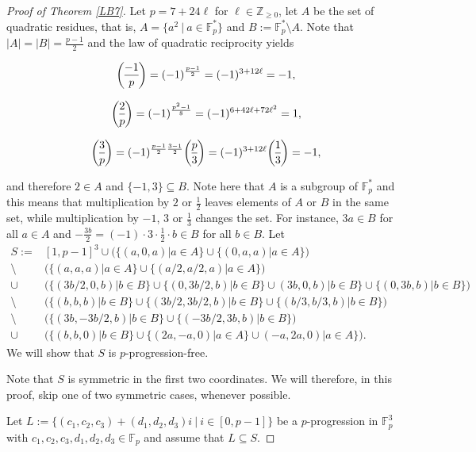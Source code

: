 \documentclass[12pt]{amsart}
\newcommand{\<}{\langle}
\renewcommand{\>}{\rangle}
\numberwithin{equation}{section}
\numberwithin{theorem}{section}
\newcommand{\genlegendre}[4]{%
  \genfrac{(}{)}{}{#1}{#3}{#4}%
  \if\relax\detokenize{#2}\relax\else_{\!#2}\fi
}
\newcommand{\legendre}[3][]{\genlegendre{}{#1}{#2}{#3}}
\begin{document}
\begin{proof}[Proof of Theorem \ref{LB7}]
Let $p=7+24\ell$ for $\ell\in\mathbb{Z}_{\geq0}$, let $A$ be the set of quadratic residues, that is, $A=\{a^2\ |\ a\in\mathbb{F}_p^*\}$ and $B:=\mathbb{F}_p^*\setminus A$. Note that $|A|=|B|=\frac{p-1}{2}$ and the law of quadratic reciprocity yields 

$$\legendre{-1}{p}=(-1)^{\frac{p-1}{2}}=(-1)^{3+12\ell}=-1,$$

$$\legendre{2}{p}=(-1)^{\frac{p^2-1}{8}}=(-1)^{6+42\ell+72\ell^2}=1,$$

$$\legendre{3}{p}=(-1)^{\frac{p-1}{2}\frac{3-1}{2}}\legendre{p}{3}=(-1)^{3+12\ell}\legendre{1}{3}=-1,$$


 and therefore $2\in A$ and $\{-1,3\}\subseteq B$. Note here that $A$ is a subgroup of $\mathbb{F}_p^*$ and this means that multiplication by $2$ or $\frac{1}{2}$ leaves elements of $A$ or $B$ in the same set, while multiplication by $-1$, $3$ or $\frac{1}{3}$ changes the set. For instance, $3a\in B$ for all $a\in A$ and $-\frac{3b}{2}=(-1)\cdot 3\cdot \frac{1}{2} \cdot b \in B$ for all $b\in B$.
Let 
\begin{equation*}
\begin{split}   
S:=&[1,p-1]^3\cup \big(\{(a,0,a)|a\in A\}\cup \{(0,a,a)|a\in A\}\big) \\ 
\setminus &\big(\{(a,a,a)|a\in A\}\cup \{(a/2,a/2,a)|a\in A\}\big) \\ 
 \cup &\big(\{(3b/2,0,b)|b\in B\}\cup \{(0,3b/2,b)|b\in B\}\cup (3b,0,b)|b\in B\}\cup \{(0,3b,b)|b\in B\}\big) \\
\setminus &\big(\{(b,b,b)|b\in B\}\cup \{(3b/2,3b/2,b)|b\in B\}\cup\{(b/3,b/3,b)|b\in B\}\big) \\
\setminus &\big( \{(3b,-3b/2,b)|b\in B\}\cup \{(-3b/2,3b,b)|b\in B\}\big) \\
\cup &\big(\{(b,b,0)|b\in B\}\cup \{(2a,-a,0)|a\in A\}\cup (-a,2a,0)|a\in A\}\big).
\end{split}
\end{equation*}
We will show that $S$ is $p$-progression-free. 


Note that $S$ is symmetric in the first two coordinates. We will therefore, in this proof, skip one of two symmetric cases, whenever possible.





Let  $L:=\{(c_1,c_2,c_3)+(d_1,d_2,d_3)i \ |\  i\in [0,p-1]\}$ be a $p$-progression in $\mathbb{F}_p^3$ with $c_1,c_2,c_3,d_1,d_2,d_3\in\mathbb{F}_p$ and assume that $L\subseteq S$.


\end{proof}
\end{document}

